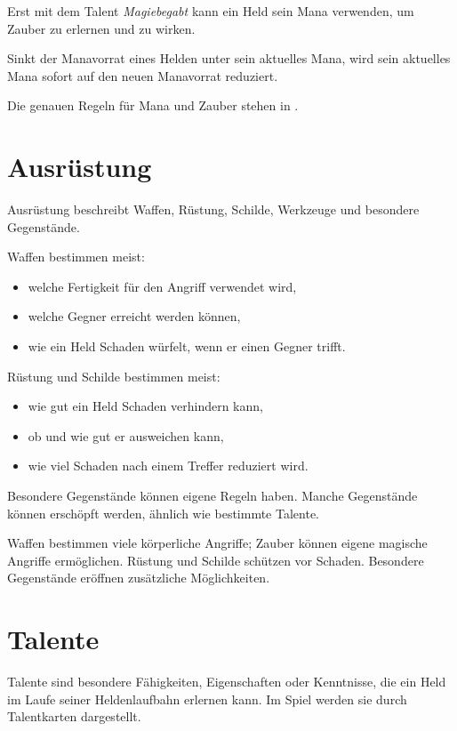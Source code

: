 Erst mit dem Talent \emph{Magiebegabt} kann ein Held sein Mana verwenden, um Zauber zu erlernen und zu wirken.

Sinkt der Manavorrat eines Helden unter sein aktuelles Mana, wird sein aktuelles Mana sofort auf den neuen Manavorrat reduziert.

Die genauen Regeln für Mana und Zauber stehen in .

\section{Ausrüstung}

Ausrüstung beschreibt Waffen, Rüstung, Schilde, Werkzeuge und besondere Gegenstände.

Waffen bestimmen meist:

\begin{itemize}
\item welche Fertigkeit für den Angriff verwendet wird,
\item welche Gegner erreicht werden können,
\item wie ein Held Schaden würfelt, wenn er einen Gegner trifft.
\end{itemize}

Rüstung und Schilde bestimmen meist:

\begin{itemize}
\item wie gut ein Held Schaden verhindern kann,
\item ob und wie gut er ausweichen kann,
\item wie viel Schaden nach einem Treffer reduziert wird.
\end{itemize}

Besondere Gegenstände können eigene Regeln haben. Manche Gegenstände können erschöpft werden, ähnlich wie bestimmte Talente.

\begin{kurzregel}[title=Ausrüstung im Überblick]
Waffen bestimmen viele körperliche Angriffe; Zauber können eigene magische Angriffe ermöglichen. Rüstung und Schilde schützen vor Schaden. Besondere Gegenstände eröffnen zusätzliche Möglichkeiten.
\end{kurzregel}

\section{Talente}

Talente sind besondere Fähigkeiten, Eigenschaften oder Kenntnisse, die ein Held im Laufe seiner Heldenlaufbahn erlernen kann. Im Spiel werden sie durch Talentkarten dargestellt.

